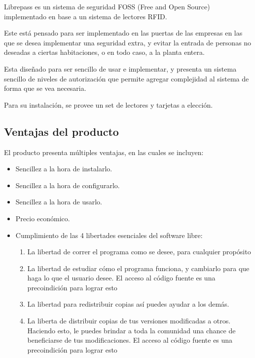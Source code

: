 \documentclass{article}
\begin{document}
Librepass es un sistema de seguridad FOSS (Free and Open Source) implementado en
base a un sistema de lectores RFID.

Este está pensado para ser implementado en las puertas de las empresas en
las que se desea implementar una seguridad extra, y evitar la entrada de personas
no deseadas a ciertas habitaciones, o en todo caso, a la planta entera.

Esta diseñado para ser sencillo de usar e implementar, y presenta un sistema
sencillo de niveles de autorización que permite agregar complejidad al sistema
de forma que se vea necesaria.

Para su instalación, se provee un set de lectores y tarjetas a elección.

\subsection{Ventajas del producto}
El producto presenta múltiples ventajas, en las cuales se incluyen:
\begin{itemize}
	\item Sencillez a la hora de instalarlo.
	\item Sencillez a la hora de configurarlo.
	\item Sencillez a la hora de usarlo.
	\item Precio económico.
	\item Cumplimiento de las 4 libertades esenciales del software libre:
	      \begin{enumerate}
		      \item La libertad de correr el programa como se desee, para cualquier propósito
		      \item La libertad de estudiar cómo el programa funciona, y cambiarlo para que
		            haga lo que el usuario desee.
		            El acceso al código fuente es una precoindición para lograr esto
		      \item La libertad para redistribuir copias así puedes ayudar a los demás.
		      \item La liberta de distribuir copias de tus versiones modificadas a otros.
		            Haciendo esto, le puedes brindar a toda la comunidad una chance de beneficiarse
		            de tus modificaciones.
		            El acceso al código fuente es una precoindición para lograr esto
	      \end{enumerate}
\end{itemize}
\end{document}
